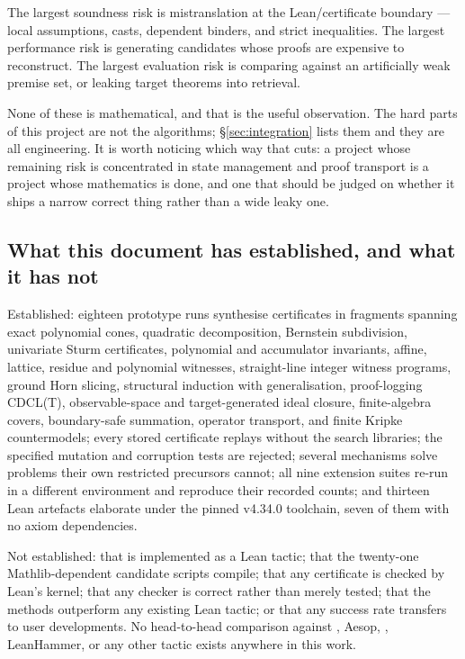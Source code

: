 The largest soundness risk is mistranslation at the Lean/certificate boundary
--- local assumptions, casts, dependent binders, and strict inequalities. The
largest performance risk is generating candidates whose proofs are expensive to
reconstruct. The largest evaluation risk is comparing against an artificially
weak premise set, or leaking target theorems into retrieval.

None of these is mathematical, and that is the useful observation. The hard
parts of this project are not the algorithms; \S\ref{sec:integration} lists them
and they are all engineering. It is worth noticing which way that cuts: a
project whose remaining risk is concentrated in state management and proof
transport is a project whose mathematics is done, and one that should be judged
on whether it ships a narrow correct thing rather than a wide leaky one.

\subsection{What this document has established, and what it has not}

Established: eighteen prototype runs synthesise certificates in fragments
spanning exact polynomial cones, quadratic decomposition, Bernstein subdivision,
univariate Sturm certificates, polynomial and accumulator invariants, affine,
lattice, residue and polynomial witnesses, straight-line integer witness
programs, ground Horn slicing, structural induction with generalisation,
proof-logging CDCL(T), observable-space and target-generated ideal closure,
finite-algebra covers, boundary-safe summation, operator transport, and finite
Kripke countermodels; every stored certificate replays without the search
libraries; the specified mutation and corruption tests are rejected; several
mechanisms solve problems their own restricted precursors cannot; all nine
extension suites re-run in a different environment and reproduce their recorded
counts; and thirteen Lean artefacts elaborate under the pinned v4.34.0
toolchain, seven of them with no axiom dependencies.

Not established: that \forge{} is implemented as a Lean tactic; that the
twenty-one Mathlib-dependent candidate scripts compile; that any certificate
is checked by Lean's kernel; that any checker is correct rather than merely
tested; that the methods outperform any existing Lean tactic; or that any
success rate transfers to user developments. No head-to-head comparison against
\grind{}, Aesop, , LeanHammer, or any other tactic exists
anywhere in this work.

